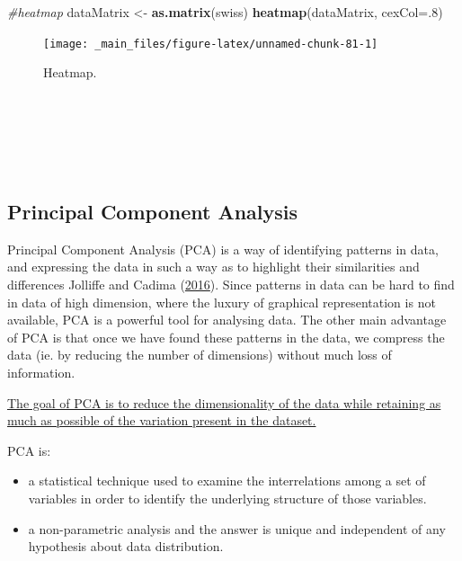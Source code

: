 \documentclass[
]{article}
\newenvironment{Shaded}{\begin{snugshade}}{\end{snugshade}}
\newcommand{\AttributeTok}[1]{\textcolor[rgb]{0.13,0.29,0.53}{#1}}
\newcommand{\CommentTok}[1]{\textcolor[rgb]{0.56,0.35,0.01}{\textit{#1}}}
\newcommand{\DecValTok}[1]{\textcolor[rgb]{0.00,0.00,0.81}{#1}}
\newcommand{\FunctionTok}[1]{\textcolor[rgb]{0.13,0.29,0.53}{\textbf{#1}}}
\newcommand{\NormalTok}[1]{#1}
\newcommand{\OtherTok}[1]{\textcolor[rgb]{0.56,0.35,0.01}{#1}}
\providecommand{\tightlist}{%
  \setlength{\itemsep}{0pt}\setlength{\parskip}{0pt}}
\begin{document}
\begin{Shaded}
\begin{Highlighting}[]
\CommentTok{\#heatmap}
\NormalTok{dataMatrix }\OtherTok{\textless{}{-}} \FunctionTok{as.matrix}\NormalTok{(swiss)}
\FunctionTok{heatmap}\NormalTok{(dataMatrix, }\AttributeTok{cexCol=}\NormalTok{.}\DecValTok{8}\NormalTok{)}
\end{Highlighting}
\end{Shaded}

\begin{figure}[H]

{\centering \texttt{[image: \_main\_files/figure-latex/unnamed-chunk-81-1]} 

}

\caption{Heatmap.}\label{fig:unnamed-chunk-81}
\end{figure}

~

~

~

\hypertarget{principal-component-analysis}{%
\subsection{Principal Component Analysis}\label{principal-component-analysis}}

Principal Component Analysis (PCA) is a way of identifying patterns in
data, and expressing the data in such a way as to highlight their
similarities and differences Jolliffe and Cadima (\protect\hyperlink{ref-jolliffe2016}{2016}). Since patterns
in data can be hard to find in data of high dimension, where the luxury
of graphical representation is not available, PCA is a powerful tool for
analysing data. The other main advantage of PCA is that once we have
found these patterns in the data, we compress the data (ie. by reducing
the number of dimensions) without much loss of information.

\ul{The goal of PCA is to reduce the dimensionality of the data while
retaining as much as possible of the variation present in the
dataset.}

PCA is:

\begin{itemize}
\tightlist
\item
  a statistical technique used to examine the interrelations among a
  set of variables in order to identify the underlying structure of
  those variables.
\item
  a non-parametric analysis and the answer is unique and independent
  of any hypothesis about data distribution.
\end{itemize}
\end{document}
